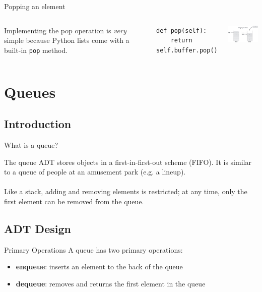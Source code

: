 \documentclass{beamer}
\begin{document}
\begin{frame}[fragile]{Popping an element}
\begin{columns}
    Implementing the pop operation is \textit{very} simple because Python lists come with a built-in \lstinline[language=iPython]{pop} method.
    \begin{center}
    \begin{lstlisting}[language=iPython]
def pop(self):
    return self.buffer.pop()\end{lstlisting}
    \end{center}
    \centering
    \includegraphics[width=3.5cm]{lessons/images/stack_pop_operation.jpg}
\end{columns}
\end{frame}

\section{Queues}
\subsection{Introduction}
\begin{frame}{What is a queue?}
    
The queue ADT stores objects in a first-in-first-out scheme (FIFO). It is similar to a queue of people at an amusement park (e.g. a lineup).
\\~\\
Like a stack, adding and removing elements is restricted; at any time, only the first element can be removed from the queue.
\end{frame}

\subsection{ADT Design}
\begin{frame}{Primary Operations}
A queue has two primary operations:
\begin{itemize}
    \item \textbf{enqueue}: inserts an element to the back of the queue
    \item \textbf{dequeue}: removes and returns the first element in the queue
\end{itemize}
\end{frame}
\end{document}

